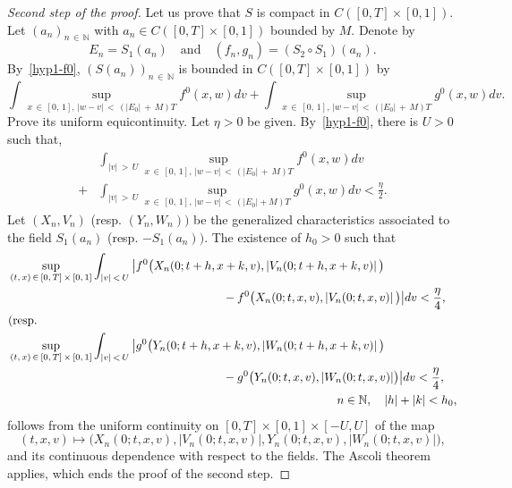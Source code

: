 \documentclass[10pt]{amsart}
\theoremstyle{definition}\newtheorem{defi}[theo]{Definition}\newtheorem{rema}[theo]{Remark}\newtheorem{exam}[theo]{Example}\newtheorem{exem}[theo]{Example}\newtheorem{nota}[theo]{Notation}
\newcommand{\N}{\mathbb{N}}
\begin{document}
\begin{proof}[{Second step of the proof}]
Let us prove that $S$ is compact in $C([0,T] \times [0,1])$. Let $(a_n)_{n\,\in\,\N}$ with $a_n\in C([0,T] \times [0,1])$ bounded by $M$. Denote by
\[
E_n = S_1\left(a_n\right)\quad \text{and} \quad \left(f_n,g_n\right) = \left(S_2 \circ S_1\right)\left(a_n\right).
\]
By~\eqref{hyp1-f0}, $(S(a_n))_{n\,\in\,\N}$ is bounded in $C([0,T] \times [0,1])$ by
\[
\int \sup_{x\,\in\,[0,\,1],\,|w-v|\,<\,\left(\left|E_0\right|\,+\,M\right)T} f^0(x,w)dv + \int \sup_{x\,\in\,[0,\,1],\,|w-v|\,<\,\left(\left|E_0\right|\,+\,M\right)T} g^0(x,w)dv.
\]
Prove its uniform equicontinuity. Let $\eta>0$ be given. By~\eqref{hyp1-f0}, there is $U>0$ such that,
\begin{align*}
&\int_{|v|\,>\,U} \sup_{x\,\in\,[0,\,1],\,|w-v|\,<\,\left(|E_0|\,+\,M\right)T} f^0(x,w)dv\\
+&\int_{|v|\,>\,U} \sup_{x\,\in\,[0,\,1],\,|w-v|\,<\,\left(|E_0|+M\right)T} g^0(x,w)dv < \frac{\eta }{2}.
\end{align*}
Let $(X_n,V_n)$ (resp. $(Y_n,W_n))$ be the generalized characteristics associated to the field $S_1(a_n)$ (resp. $-S_1(a_n))$. The existence of $h_0>0$ such that
\begin{align*}
&\sup _{(t,\,x)\,\in\,[0,\,T]\,\times\,[0,\,1]} \int_{|v|\,<\,U} \big| f^0\big(X_n(0;t+h,x+k,v),\left\lvert V_n(0;t+h,x+k,v)\right\rvert\big) \\
& \hspace*{2.5in}-f^0\big(X_n(0;t,x,v),\left\lvert V_n(0;t,x,v)\right\rvert\big) \big| dv < \frac{\eta }{4}, \\
&(\text{resp. } \\
&\sup_{(t,\,x)\,\in\,[0,\,T]\,\times\,[0,\,1]} \int _{|v|\,<\,U} \big| g^0\big(Y_n(0;t+h,x+k,v),\left\lvert W_n(0;t+h,x+k,v)\right\rvert\big) \\
&\hspace*{2.5in}-g^0\big(Y_n(0;t,x,v),\lvert W_n(0;t,x,v)\rvert\big) \big| dv < \frac{\eta }{4}, \\
&\hspace*{3.83in}n \in \N,\quad |h|+|k|<h_0,
\end{align*}
follows from the uniform continuity on $[0,T] \times [0,1] \times [-U,U]$ of the map
\[
(t,x,v) \mapsto \big (X_n(0;t,x,v), \lvert V_n(0;t,x,v)\rvert, Y_n(0;t,x,v), \lvert W_n(0;t,x,v) \rvert \big),
\]
and its continuous dependence with respect to the fields. The Ascoli theorem applies, which ends the proof of the second step.
\end{proof}
\end{document}
